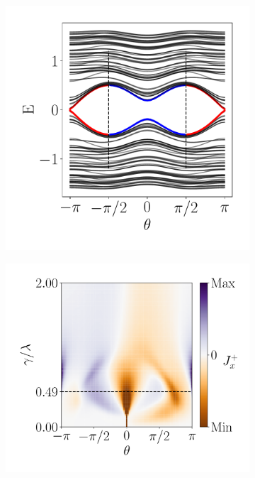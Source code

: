 \begin{figure}[h!]
     \centering
    \captionsetup[sub]{font=small}
     \begin{minipage}[h!]{1\textwidth}
         \begin{subfigure}[b!]{0.3 \textwidth}
             \caption{}
             \includegraphics[width=\textwidth]{Imagenes/Resultados_pump_Fractal/x/param_pump_A=0.5x.pdf}
             \label{}
         \end{subfigure}\hspace*{-0.5em}
         \begin{subfigure}[b!]{0.35 \textwidth}
             \caption{}
             \includegraphics[width=\textwidth]{Imagenes/Resultados_pump_Fractal/x/current_square_pumpx.pdf}

\end{subfigure}
\end{minipage}
\end{figure}

